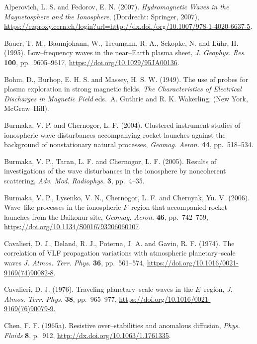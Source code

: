 \documentclass[a4paper,openany,12pt]{book}
\begin{document}
\begin{thebibliography}{100}

\bibitem{}
Alperovich, L. S. and Fedorov, E. N. (2007). {\it Hydromagnetic Waves in the Magnetosphere and the Ionosphere}, (Dordrecht: Springer, 2007), \url{https://ezproxy.cern.ch/login?url=http://dx.doi./org/10.1007/978-1-4020-6637-5}.

\bibitem{}
Bauer, T. M., Baumjohann, W., Treumann, R. A., Sckopke, N. and L\"uhr, H. (1995). Low--frequency waves in the near--Earth plasma sheet, {\it J. Geophys. Res.} \textbf{100}, pp.~9605--9617, \url{https://doi.org/10.1029/95JA00136}.

\bibitem{}
Bohm, D., Burhop, E. H. S. and Massey, H. S. W. (1949). The use of probes for plasma exploration in strong magnetic fields,  \emph{The Characteristics of Electrical Discharges in Magnetic Field} eds.~A. Guthrie and R. K. Wakerling, (New York, McGraw--Hill).

\bibitem{}
Burmaka, V. P. and Chernogor, L. F. (2004). Clustered instrument studies of ionospheric wave disturbances accompanying rocket launches against the background of nonstationary natural processes, 
{\it Geomag. Aeron.} \textbf{44}, pp.~518--534.

 \bibitem{}
Burmaka, V. P., Taran, L. F. and Chernogor, L. F. (2005). Results of investigations of the wave disturbances in the ionosphere by noncoherent scattering, {\it Adv. Mod. Radiophys.} \textbf{3}, pp.~4--35.

\bibitem{}
Burmaka, V. P., Lysenko, V. N., Chernogor, L. F. and Chernyak, Yu. V. (2006). Wave--like processes in the ionospheric $F$--region that accompanied rocket launches from the Baikonur site, {\it Geomag. Aeron.} \textbf{46}, pp.~742--759, \url{https://doi.org/10.1134/S0016793206060107}.

\bibitem{}
Cavalieri, D. J., Deland, R. J., Poterna, J. A. and Gavin, R. F. (1974). The correlation of VLF propagation variations with atmospheric planetary--scale waves {\it J. Atmos. Terr. Phys.} \textbf{36}, pp.~561--574, \url{https://doi.org/10.1016/0021-9169(74)90082-8}.

\bibitem{}
Cavalieri, D. J. (1976). Traveling planetary--scale waves in the $E$--region, {\it J. Atmos. Terr. Phys.} \textbf{38}, pp.~965--977, \url{https://doi.org/10.1016/0021-9169(76)90079-9.}

\bibitem{}
Chen, F. F. (1965a). Resistive over--stabilities and anomalous diffusion, \emph{Phys. Fluids} \textbf{8}, 
p.~912, \url{http://dx.doi.org/10.1063/1.1761335}.


\end{thebibliography}
\end{document}
